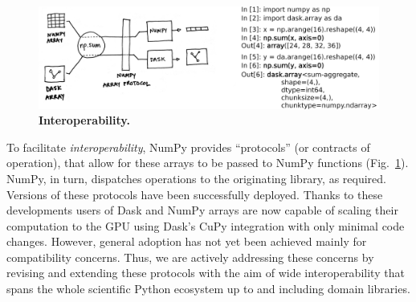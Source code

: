 \begin{figure}
  \centering
  \includegraphics[width=.9\textwidth]{static/sketches/array_protocol.jpg}
  \caption{\textbf{Interoperability.} }\label{fig:duck-arrays}
\end{figure}

To facilitate \emph{interoperability}, NumPy provides
``protocols'' (or contracts of operation), that allow for these arrays to be
passed to NumPy functions (Fig.~\ref{fig:duck-arrays}).
NumPy, in turn, dispatches operations to the originating library, as required.
Versions of these protocols have been successfully deployed.
Thanks to these developments users of Dask and NumPy arrays are now capable
of scaling their computation to the GPU using Dask's CuPy integration with
only minimal code changes.
However, general adoption has not yet been achieved mainly for compatibility
concerns.
Thus, we are actively addressing these concerns by revising and extending
these protocols with the aim of wide interoperability that spans the whole
scientific Python ecosystem up to and including domain libraries.

